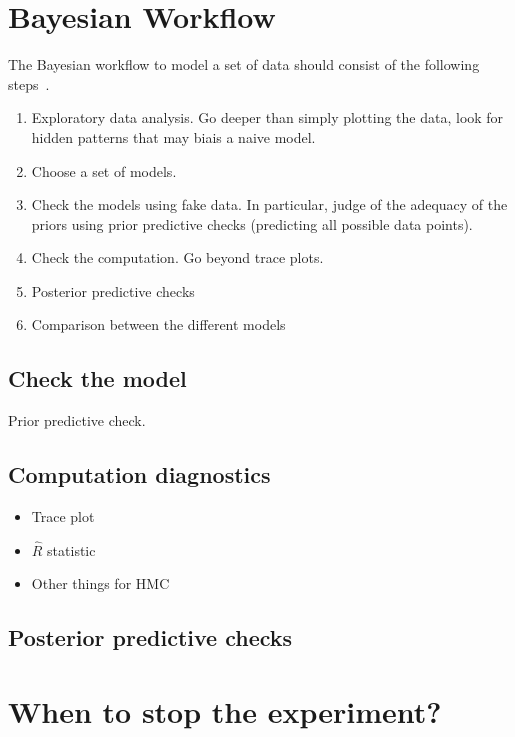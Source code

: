 \documentclass{tufte-book}
\begin{document}
\section{Bayesian Workflow}

The Bayesian workflow to model a set of data should consist of the following steps~\cite{Gabry2018}.

\begin{enumerate}
    \item Exploratory data analysis. Go deeper than simply plotting the data, look for hidden patterns that
      may biais a naive model.
    \item Choose a set of models.
    \item Check the models using fake data. In particular, judge of the adequacy of the priors using prior
      predictive checks (predicting all possible data points).
    \item Check the computation. Go beyond trace plots.
    \item Posterior predictive checks
    \item Comparison between the different models
\end{enumerate}

  \subsection{Check the model}

Prior predictive check.~\cite{Betancourt2018}
  
  \subsection{Computation diagnostics}

\begin{itemize}
    \item Trace plot
    \item $\hat{R}$ statistic
    \item Other things for HMC~\cite{Betancourt2017}
\end{itemize}


  \subsection{Posterior predictive checks}


\section{When to stop the experiment?}
\end{document}
